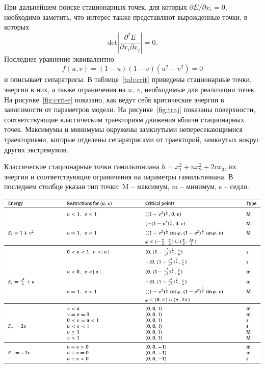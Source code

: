 \documentclass[a4paper, 10pt, twocolumn]{article}
\begin{document}
При дальнейшем поиске стационарных точек, для которых $\partial 
E / \partial x_i = 0$, необходимо заметить, что интерес также 
представляют вырожденные точки, в которых
$$ \mathrm{det} \left| \frac{\partial^2 E}{\partial x_i \partial x_j} \right| = 0. $$
Последнее уравнение эквивалентно
$$ f(u,v) = (1-u)(1-v)(u^2 - v^2) = 0 $$
и описывает сепаратрисы.
В таблице~\ref{tab:crit} приведены стационарные точки, энергии в них, 
а также ограничения на $u,\ v$, необходимые для реализации точек. На 
рисунке~\ref{fig:crit-e} показано, как ведут себя критические энергии 
в зависимости от параметров модели. На рисунке~\ref{fig:traj} показаны 
поверхности, соответствующие классическим траекториям движения вблизи 
стационарных точек. Максимумы и минимумы окружены замкнутыми 
непересекающимися траекториями, которые отделены сепаратрисами от 
траекторий, замкнутых вокруг других экстремумов.

\begin{table}%
	\centering
	\caption{Классические стационарные точки гамильтониана $ h = x_1^2 
	+ u x_2^2 + 2 v x_3$, их энергии и соответствующие ограничения на 
	параметры гамильтониана. В последнем столбце указан тип точки: M -- 
	максимум, m -- минимум, s -- седло.}
	\label{tab:crit}
	\includegraphics[width=.7\linewidth]{figures/crit-table}
\end{table}%
\end{document}
